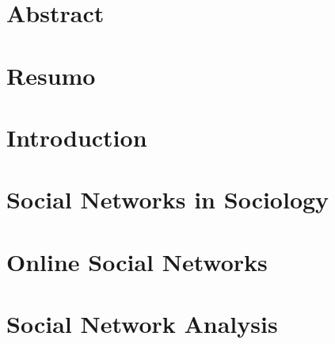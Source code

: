 \documentclass[
  oneside,
  11pt, a4paper,
  footinclude=true,
  headinclude=true,
  cleardoublepage=empty
]{scrbook}
\author{Jorge Caldas}
\date{\myear}
\begin{document}
	\umfrontcover
	\umtitlepage

	\chapter*{Abstract}
	

	\cleardoublepage
	\chapter*{Resumo}
	

	\tableofcontents


	\listoffigures
	\listoftables
	\printglossary[type=\acronymtype]
	\clearpage
	\thispagestyle{empty}


	\chapter{Introduction}
	


	\chapter{Social Networks in Sociology}
	


	\chapter{Online Social Networks}
	


	\chapter{Social Network Analysis}
	
\end{document}
